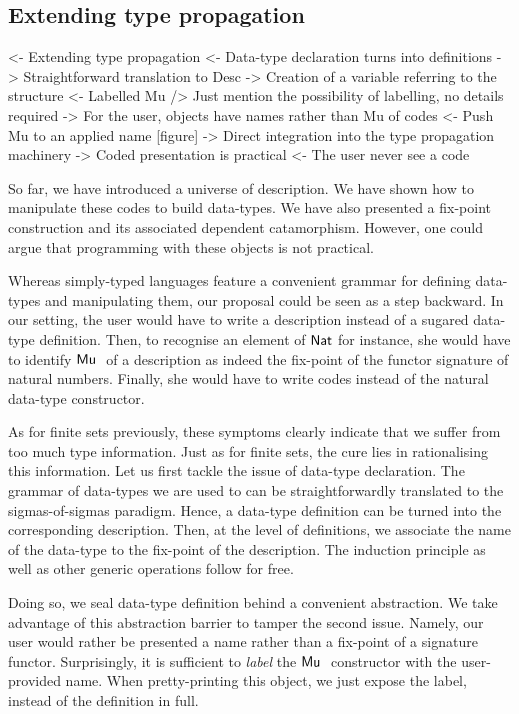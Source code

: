 \subsection{Extending type propagation}

\begin{wstructure}
<- Extending type propagation
    <- Data-type declaration turns into definitions
        -> Straightforward translation to Desc
        -> Creation of a variable referring to the structure
    <- Labelled Mu
        /> Just mention the possibility of labelling, no details required
        -> For the user, objects have names rather than Mu of codes
    <- Push Mu to an applied name [figure]
        -> Direct integration into the type propagation machinery
    -> Coded presentation is practical
        <- The user never see a code
\end{wstructure}


So far, we have introduced a universe of description. We have shown
how to manipulate these codes to build data-types. We have also
presented a fix-point construction and its associated dependent
catamorphism. However, one could argue that programming with these
objects is not practical.

Whereas simply-typed languages feature a convenient grammar for
defining data-types and manipulating them, our proposal could be seen
as a step backward. In our setting, the user would have to write a
description instead of a sugared data-type definition. Then, to
recognise an element of $\Nat$ for instance, she would have to
identify $\Mu{}$ of a description as indeed the fix-point of the
functor signature of natural numbers. Finally, she would have to write
codes instead of the natural data-type constructor.

As for finite sets previously, these symptoms clearly indicate that we
suffer from too much type information. Just as for finite sets, the
cure lies in rationalising this information. Let us first tackle the
issue of data-type declaration. The grammar of data-types we are used
to can be straightforwardly translated to the sigmas-of-sigmas
paradigm. Hence, a data-type definition can be turned into the
corresponding description. Then, at the level of definitions, we
associate the name of the data-type to the fix-point of the
description. The induction principle as well as other generic
operations follow for free.

Doing so, we seal data-type definition behind a convenient
abstraction. We take advantage of this abstraction barrier to tamper
the second issue. Namely, our user would rather be presented a name
rather than a fix-point of a signature functor. Surprisingly, it is
sufficient to \emph{label} the $\Mu{}$ constructor with the
user-provided name. When pretty-printing this object, we just expose
the label, instead of the definition in full.

